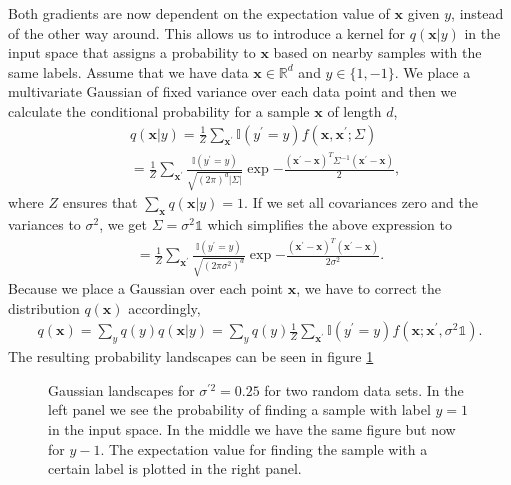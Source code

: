 Both gradients are now dependent on the expectation value of $\mathbf{x}$ given $y$, instead of the other way around. This allows us to introduce a kernel for $q(\mathbf{x}|y)$ in the input space that assigns a probability to $\mathbf{x}$ based on nearby samples with the same labels. Assume that we have data $\mathbf{x}\in \mathbb{R}^d$ and $y \in \{1, -1\}$. We place a multivariate Gaussian of fixed variance over each data point and then we calculate the conditional probability for a sample $\mathbf{x}$ of length $d$,
\begin{align*}
    &q(\mathbf{x} | y) = \frac{1}{Z}\sum_{\mathbf{x}^\prime} \mathds{I}(y^\prime = y) f(\mathbf{x}, \mathbf{x}^\prime; \Sigma)\\ &=\frac{1}{Z}\sum_{\mathbf{x}^\prime} \frac{\mathds{I}(y^\prime = y) }{\sqrt{(2 \pi)^d |\Sigma|}} \exp{-\frac{(\mathbf{x}^\prime - \mathbf{x})^T\Sigma^{-1}(\mathbf{x}^\prime - \mathbf{x})}{2}},
\end{align*}
where $Z$ ensures that $\sum_{\mathbf{x}} q(\mathbf{x} | y) = 1$. If we set all covariances zero and the variances to $\sigma^2$, we get $\Sigma = \sigma^2 \mathbb{1}$ which simplifies the above expression to
\begin{align*}
    = \frac{1}{Z}\sum_{\mathbf{x}^\prime} \frac{\mathds{I}(y^\prime = y) }{\sqrt{(2 \pi \sigma^2)^d }} \exp{-\frac{(\mathbf{x}^\prime - \mathbf{x})^T(\mathbf{x}^\prime - \mathbf{x})}{2\sigma^2}}.
\end{align*}
Because we place a Gaussian over each point $\mathbf{x}$, we have to correct the distribution $q(\mathbf{x})$ accordingly,
\begin{align*}
    q(\mathbf{x}) = \sum_y q(y)q(\mathbf{x}|y) =  \sum_y q(y)\frac{1}{Z}\sum_{\mathbf{x}^\prime} \mathds{I}(y^\prime = y) f(\mathbf{x}; \mathbf{x}^\prime, \sigma^2 \mathbb{1}).
\end{align*}
The resulting probability landscapes can be seen in figure \ref{fig:gaussian_landscape}
\begin{figure}[htb!]
    \centering
    \caption{Gaussian landscapes for $\sigma^{\prime 2} = 0.25$ for two random data sets. In the left panel we see the probability of finding a sample with label $y=1$ in the input space. In the middle we have the same figure but now for $y-1$. The expectation value for finding the sample with a certain label is plotted in the right panel.}
    \label{fig:gaussian_landscape}
\end{figure}{}
